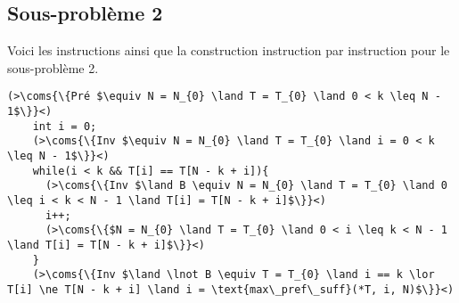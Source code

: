 \subsection{Sous-problème 2}

Voici les instructions ainsi que la construction instruction par instruction pour le sous-problème 2.
\begin{lstlisting}[caption={Sous-problème 2}]
    (>\coms{\{Pré $\equiv N = N_{0} \land T = T_{0} \land 0 < k \leq N - 1$\}}<)
    int i = 0;
    (>\coms{\{Inv $\equiv N = N_{0} \land T = T_{0} \land i = 0 < k \leq N - 1$\}}<)
    while(i < k && T[i] == T[N - k + i]){
      (>\coms{\{Inv $\land B \equiv N = N_{0} \land T = T_{0} \land 0 \leq i < k < N - 1 \land T[i] = T[N - k + i]$\}}<) 
      i++;
      (>\coms{\{$N = N_{0} \land T = T_{0} \land 0 < i \leq k < N - 1 \land T[i] = T[N - k + i]$\}}<)
    }
    (>\coms{\{Inv $\land \lnot B \equiv T = T_{0} \land i == k \lor T[i] \ne T[N - k + i] \land i = \text{max\_pref\_suff}(*T, i, N)$\}}<)
\end{lstlisting}

